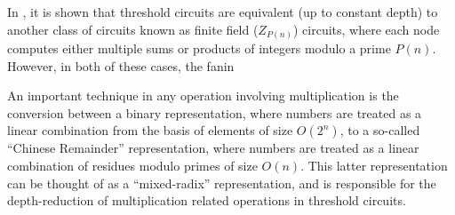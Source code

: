 In \cite{Reif1992}, it is shown that threshold circuits
are equivalent (up to constant depth) to another class of
circuits known as finite field ($Z_{P(n)}$) circuits, where each node
computes either multiple sums or products of integers modulo a
prime $P(n)$. However, in both of these cases, the fanin

An important technique in any operation involving multiplication is
the conversion between a binary representation, where numbers are
treated as a linear combination from the basis of elements of
size $O(2^n)$, to a so-called ``Chinese Remainder'' representation,
where numbers are treated as a linear combination of residues
modulo primes of size $O(n)$. This latter representation can be thought
of as a ``mixed-radix'' representation, and is responsible for
the depth-reduction of multiplication related operations in
threshold circuits.